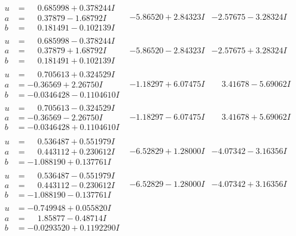 \documentclass[1p]{elsarticle_modified}
\theoremstyle{definition}
\begin{document}
$$\begin{array}{c|c|c}
\begin{aligned}
u &= \phantom{-}0.685998 + 0.378244 I \\
a &= \phantom{-}0.37879 - 1.68792 I \\
b &= \phantom{-}0.181491 - 0.102139 I\end{aligned}
 & -5.86520 + 2.84323 I & -2.57675 - 3.28324 I \\ \hline\begin{aligned}
u &= \phantom{-}0.685998 - 0.378244 I \\
a &= \phantom{-}0.37879 + 1.68792 I \\
b &= \phantom{-}0.181491 + 0.102139 I\end{aligned}
 & -5.86520 - 2.84323 I & -2.57675 + 3.28324 I \\ \hline\begin{aligned}
u &= \phantom{-}0.705613 + 0.324529 I \\
a &= -0.36569 + 2.26750 I \\
b &= -0.0346428 - 0.1104610 I\end{aligned}
 & -1.18297 + 6.07475 I & \phantom{-}3.41678 - 5.69062 I \\ \hline\begin{aligned}
u &= \phantom{-}0.705613 - 0.324529 I \\
a &= -0.36569 - 2.26750 I \\
b &= -0.0346428 + 0.1104610 I\end{aligned}
 & -1.18297 - 6.07475 I & \phantom{-}3.41678 + 5.69062 I \\ \hline\begin{aligned}
u &= \phantom{-}0.536487 + 0.551979 I \\
a &= \phantom{-}0.443112 + 0.230612 I \\
b &= -1.088190 + 0.137761 I\end{aligned}
 & -6.52829 + 1.28000 I & -4.07342 - 3.16356 I \\ \hline\begin{aligned}
u &= \phantom{-}0.536487 - 0.551979 I \\
a &= \phantom{-}0.443112 - 0.230612 I \\
b &= -1.088190 - 0.137761 I\end{aligned}
 & -6.52829 - 1.28000 I & -4.07342 + 3.16356 I \\ \hline\begin{aligned}
u &= -0.749948 + 0.055820 I \\
a &= \phantom{-}1.85877 - 0.48714 I \\
b &= -0.0293520 + 0.1192290 I\end{aligned}

\end{array}$$
\end{document}
